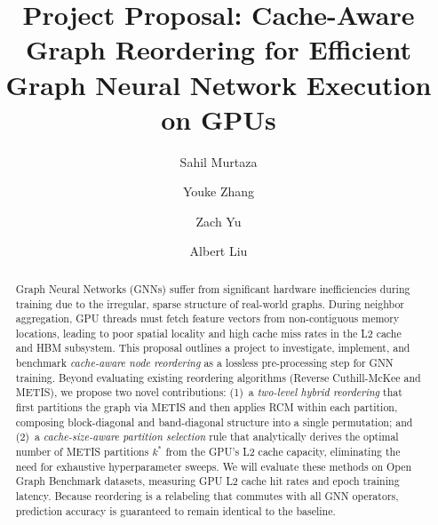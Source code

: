 \documentclass[sigconf,review]{acmart}
\begin{document}
\title{Project Proposal: Cache-Aware Graph Reordering for Efficient Graph Neural Network Execution on GPUs}

\author{Sahil Murtaza}

\author{Youke Zhang}

\author{Zach Yu}

\author{Albert Liu}

\begin{abstract}
Graph Neural Networks (GNNs) suffer from significant hardware inefficiencies during training due to the irregular, sparse structure of real-world graphs. During neighbor aggregation, GPU threads must fetch feature vectors from non-contiguous memory locations, leading to poor spatial locality and high cache miss rates in the L2 cache and HBM subsystem. This proposal outlines a project to investigate, implement, and benchmark \emph{cache-aware node reordering} as a lossless pre-processing step for GNN training. Beyond evaluating existing reordering algorithms (Reverse Cuthill-McKee and METIS), we propose two novel contributions: (1)~a \emph{two-level hybrid reordering} that first partitions the graph via METIS and then applies RCM within each partition, composing block-diagonal and band-diagonal structure into a single permutation; and (2)~a \emph{cache-size-aware partition selection} rule that analytically derives the optimal number of METIS partitions $k^*$ from the GPU's L2 cache capacity, eliminating the need for exhaustive hyperparameter sweeps. We will evaluate these methods on Open Graph Benchmark datasets, measuring GPU L2 cache hit rates and epoch training latency. Because reordering is a relabeling that commutes with all GNN operators, prediction accuracy is guaranteed to remain identical to the baseline.
\end{abstract}


\maketitle
\end{document}
